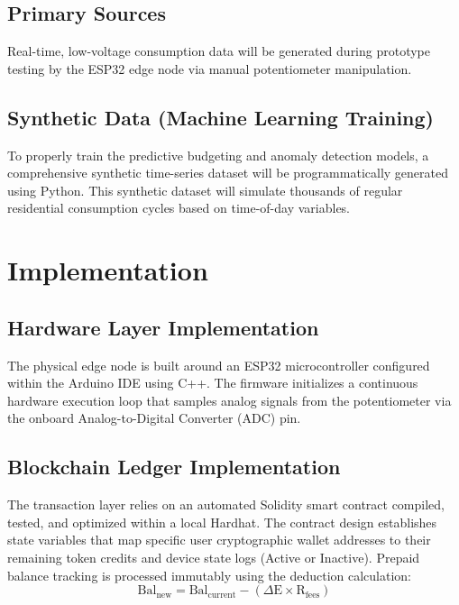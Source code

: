 \subsection{Primary Sources}
Real-time, low-voltage consumption data will be generated during prototype testing by the ESP32 edge node via manual potentiometer manipulation.
\subsection{Synthetic Data (Machine Learning Training)}
To properly train the predictive budgeting and anomaly detection models, a comprehensive synthetic time-series dataset will be programmatically generated using Python. This synthetic dataset will simulate thousands of regular residential consumption cycles based on time-of-day variables.

\section{Implementation}
\subsection{Hardware Layer Implementation}
The physical edge node is built around an ESP32 microcontroller configured within the Arduino IDE using C++. The firmware initializes a continuous hardware execution loop that samples analog signals from the potentiometer via the onboard Analog-to-Digital Converter (ADC) pin.
\subsection{Blockchain Ledger Implementation}
The transaction layer relies on an automated Solidity smart contract compiled, tested, and optimized within a local Hardhat. The contract design establishes state variables that map specific user cryptographic wallet addresses to their remaining token credits and device state logs (Active or Inactive). Prepaid balance tracking is processed immutably using the deduction calculation:$$\text{Bal}_{\text{new}} = \text{Bal}_{\text{current}} - (\Delta\text{E} \times \text{R}_{\text{fees}})$$
